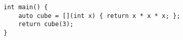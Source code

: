 \begin{lstlisting}[title=\href{https://godbolt.org/z/xWqMss}{\texttt{godbolt.org/z/xWqMss}}]
int main() { 
    auto cube = [](int x) { return x * x * x; };
    return cube(3);
}
\end{lstlisting}
